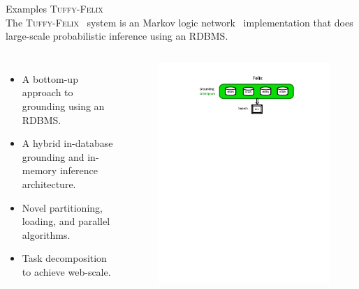 \documentclass[onlymath,xcolor=pdftex,dvipsnames,table]{beamer}
\newcommand{\tuffy}{\textsc{Tuffy}\xspace}
\newcommand{\felix}{\textsc{Felix}\xspace}
\newcommand{\head}[1]{{\large\color{OliveGreen}#1\\[2pt]}}
\begin{document}
\begin{frame}{Examples}
\head{\tuffy-\felix}
The \tuffy-\felix~\cite{DBLP:journals/pvldb/NiuRDS11,2011arXiv1108.0294N} system is an Markov logic network~\cite{richardson2006markov} implementation that does large-scale probabilistic inference using an RDBMS.
\begin{columns}[c]
  \begin{itemize}
    \item A bottom-up approach to grounding using an RDBMS.
    \item A hybrid in-database grounding and in-memory inference architecture.
    \item Novel partitioning, loading, and parallel algorithms.
    \item Task decomposition to achieve web-scale.
  \end{itemize}

  \begin{figure}
    \centering
    \includegraphics[clip,trim=125pt 500pt 125pt 30pt,width=\linewidth]{distfelix.pdf}
  \end{figure}
\end{columns}
\end{frame}
\end{document}
